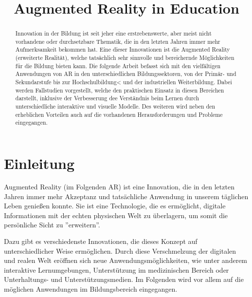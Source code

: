 \documentclass[conference]{IEEEtran}
\begin{document}
\title{Augmented Reality in Education}

\author{
}

\maketitle

\begin{abstract}
    Innovation in der Bildung ist seit jeher eine erstrebenswerte, aber meist nicht
    vorhandene oder durchsetzbare Thematik, die in den letzten Jahren immer mehr
    Aufmerksamkeit bekommen hat. Eine dieser Innovationen ist die Augmented Reality
    (erweiterte Realität), welche tatsächlich sehr sinnvolle und bereichernde
    Möglichkeiten für die Bildung bieten kann.
    Die folgende Arbeit befasst sich mit den vielfältigen Anwendungen von AR in 
    den unterschiedlichen Bildungssektoren, von der Primär- und Sekundarstufe bis zur
    Hochschulbildung< und der industriellen Weiterbildung. Dabei werden Fallstudien vorgestellt,
    welche den praktischen Einsatz in diesen Bereichen darstellt, inklusive der Verbesserung 
    dee Verständnis beim Lernen durch unterschiedliche interaktive und visuelle Modelle.
    Des weiteren wird neben den erheblichen Vorteilen auch auf die vorhandenen Herausforderungen
    und Probleme eingegangen.
\end{abstract}

\section{Einleitung}
Augmented Reality (im Folgenden AR) ist eine Innovation, die in den letzten Jahren immer mehr Akzeptanz und tatsächliche Anwendung in unserem täglichen Leben genießen konnte. 
Sie ist eine Technologie, die es ermöglicht, digitale Informationen mit der echten physischen Welt zu überlagern, um somit die persönliche Sicht zu ''erweitern''. 

Dazu gibt es verschiedenste Innovationen, die dieses Konzept 
auf unterschiedlicher Weise ermöglichen. Durch diese Verschmelzung
der digitalen und realen Welt eröffnen sich neue Anwendungsmöglichkeiten,
wie unter anderem interaktive Lernumgebungen, Unterstützung im medizinischen Bereich
oder Unterhaltungs- und Unterstützungsmedien. Im Folgenden wird vor allem auf die möglichen Anwendungen im Bildungsbereich eingegangen. 
\end{document}
